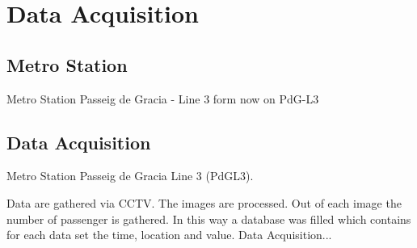 \section{Data Acquisition}
\label{sec:dataAcquisition}

\subsection{Metro Station}
\label{subsec:metroStation}

Metro Station Passeig de Gracia - Line 3 form now on PdG-L3


\subsection{Data Acquisition}
\label{subsec:dataAcquisition}

Metro Station Passeig de Gracia Line 3 (PdGL3).

Data are gathered via CCTV. The images are processed. Out of each image the number of passenger is gathered. In this way a database was filled which contains for each data set the time, location and value.
Data Acquisition...